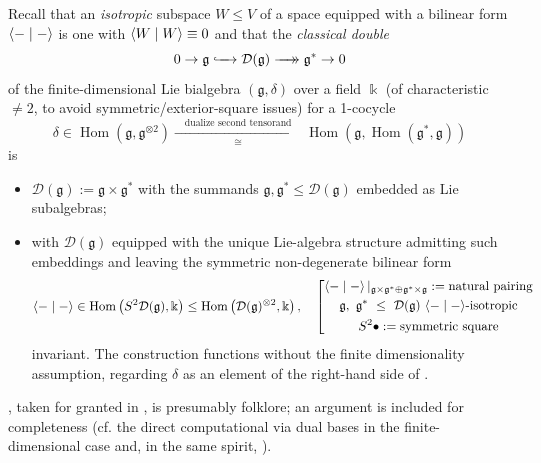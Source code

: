 \documentclass[11pt,leqno]{article}
\theoremstyle{plain}
\theoremstyle{plain}
\theoremstyle{plain}
\numberwithin{equation}{section}
\theoremstyle{nonumberplain}
\newcommand\cD{{\mathcal D}}
\newcommand\fg{{\mathfrak g}}
\newcommand\1{{\bf 1}}
\DeclareMathOperator{\Hom}{\mathrm{Hom}}
\newcommand{\xrightarrowdbl}[2][]{%
  \xrightarrow[#1]{#2}\mathrel{\mkern-14mu}\rightarrow
}
\begin{document}
Recall \cite[post Theorem 4.6]{grv_cls-gp-geom-alg_2002} that an \emph{isotropic} subspace $W\le V$ of a space equipped with a bilinear form $\Braket{-\mid -}$ is one with $\Braket{W\mid W}\equiv 0$ and that the \emph{classical double} \cite[\S 1.4B]{cp_qg}
\begin{equation}\label{eq:cls.dbl}
  0\to
  \fg
  \lhook\joinrel\xrightarrow{\quad}
  \cD(\fg)
  \xrightarrowdbl{\quad}
  \fg^*
  \to 0
\end{equation}
of the finite-dimensional Lie bialgebra $(\fg,\delta)$ over a field $\Bbbk$ (of characteristic $\ne 2$, to avoid symmetric/exterior-square issues) for a 1-cocycle
\begin{equation}\label{eq:curried.delta}
  \delta
  \in
  \Hom\left(\fg,\fg^{\otimes 2}\right)
  \xrightarrow[\quad\cong\quad]{\quad\text{dualize second tensorand}\quad}
  \Hom\left(\fg,\Hom\left(\fg^*,\fg\right)\right)
\end{equation}
is
\begin{itemize}[wide]
\item $\cD(\fg):=\fg\times \fg^*$ with the summands $\fg,\fg^*\le \cD(\fg)$ embedded as Lie subalgebras;
\item with $\cD(\fg)$ equipped with the unique Lie-algebra structure admitting such embeddings and leaving the symmetric non-degenerate bilinear form
  \begin{equation*}
    \Braket{-\mid-}
    \in
    \Hom\left(S^2 \cD(\fg),\Bbbk\right)
    \le
    \Hom\left(\cD(\fg)^{\otimes 2},\Bbbk\right)
    ,\quad
    \left[
      \begin{gathered}
        \Braket{-\mid -}|_{\fg\times \fg^*\oplus \fg^*\times \fg}:=\text{natural pairing}\\
        \fg,\ \fg^*\ \le\  \cD(\fg)\ \text{$\Braket{-\mid-}$-isotropic}\\
        S^2\bullet:=\text{symmetric square}
      \end{gathered}
    \right.
  \end{equation*}
  invariant. The construction functions without the finite dimensionality assumption, regarding $\delta$ as an element of the right-hand side of . 
\end{itemize}
, taken for granted in , is presumably folklore; an argument is included for completeness (cf. the direct computational \cite[proof of Lemma 1.3.5]{cp_qg} via dual bases in the finite-dimensional case and, in the same spirit, \cite[Remark 2.15]{MR4214399}). 
\end{document}
